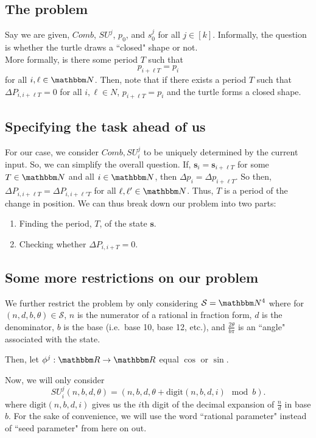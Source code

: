 \documentclass[11pt,titlepage]{article}
\newcommand{\sinOrCos}{\phi^j}
\begin{document}
\subsection{The problem}
Say we are given, $Comb$, $SU^j$, $p_0$, and $s^j_0$ for all $j \in [k]$.
Informally, the question is whether the turtle draws a ``closed" shape or not.\\
More formally, is there some period $T$ such that 
$$
  p_{i + \ell T} = p_{i}
$$
for all $i, \ell \in \N$.
Then, note that if there exists a period $T$ such that 
$\Delta P_{i, i + \ell T} = 0$ for all $i, \ell \in N$, 
$p_{i + \ell T} = p_{i}$ and the turtle forms a closed shape.

\subsection{Specifying the task ahead of us}
For our case, we consider $Comb, SU_i^j$ to be uniquely determined by the current input.
So, we can simplify the overall question.
If, $\pmb{s}_i = \pmb{s}_{i + \ell T}$ for some $T \in \N$ and all $i \in \N$, then 
$\Delta p_{i} = \Delta p_{i + \ell T}$. So then,
$\Delta P_{i, i + \ell T} = \Delta P_{i, i + \ell' T}$ for all $\ell, \ell' \in \N$.
Thus, $T$ is a period of the change in position. We can thus
break down our problem into two parts:
\begin{enumerate}
  \item Finding the period, $T$, of the state $\pmb{s}$.
  \item Checking whether $\Delta P_{i, i + T} = 0$.
\end{enumerate}

\subsection{Some more restrictions on our problem}
We further restrict the problem by only considering $\mathcal{S} = \N^4$ where for $(n, d, b, \theta) \in \mathcal{S}$,
$n$ is the numerator of a rational in fraction form, $d$ is the denominator, 
$b$ is the base (i.e.\ base 10, base 12, etc.),
and $\frac{2\theta}{b \pi}$ is an ``angle" associated with the state.

Then, let $\sinOrCos: \R \rightarrow \R$ equal $\cos$ or $\sin$. 

Now, we will only consider
$$
  SU_i^j(n, b, d, \theta) = (n, b, d, \theta + \mathrm{digit}(n, b, d, i) \mod b).
$$
where $\mathrm{digit}(n, b, d, i)$ gives us the $i$th digit of the decimal expansion of $\frac{n}{d}$
in base $b$. For the sake of convenience, we will use the word ``rational parameter" 
instead of ``seed parameter" from here on out.
\end{document}
